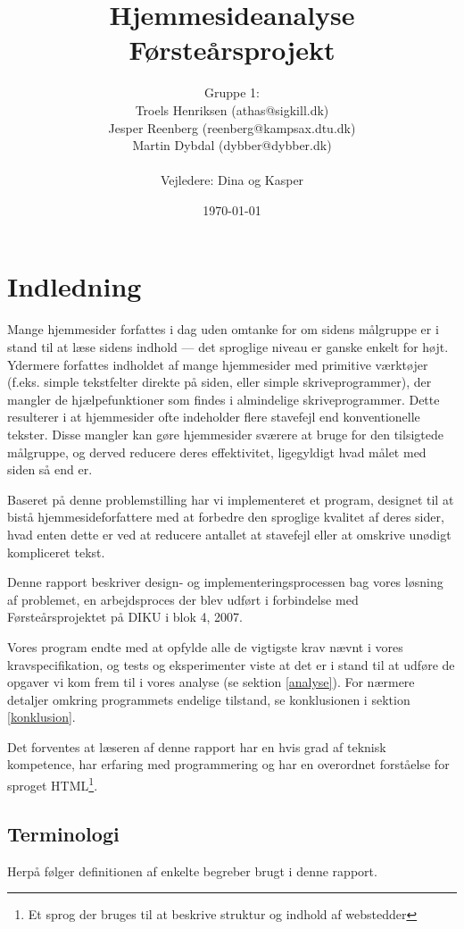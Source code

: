 \documentclass[a4paper,oneside]{memoir}
\title{Hjemmesideanalyse  \\ \small{Førsteårsprojekt}}
\author
{
  Gruppe 1:\\
  Troels Henriksen (athas@sigkill.dk)\\
  Jesper Reenberg (reenberg@kampsax.dtu.dk)\\
  Martin Dybdal (dybber@dybber.dk)\\ \\
  Vejledere: Dina og Kasper
}
\date{\today}
\begin{document}
\maketitle
\newpage
\tableofcontents*

\chapter{Indledning}
\label{indledning}
Mange hjemmesider forfattes i dag uden omtanke for om sidens målgruppe
er i stand til at læse sidens indhold --- det sproglige niveau er
ganske enkelt for højt. Ydermere forfattes indholdet af mange
hjemmesider med primitive værktøjer (f.eks. simple tekstfelter direkte
på siden, eller simple skriveprogrammer), der mangler de
hjælpefunktioner som findes i almindelige skriveprogrammer. Dette
resulterer i at hjemmesider ofte indeholder flere stavefejl end
konventionelle tekster. Disse mangler kan gøre hjemmesider sværere at
bruge for den tilsigtede målgruppe, og derved reducere deres
effektivitet, ligegyldigt hvad målet med siden så end er.

Baseret på denne problemstilling har vi implementeret et program,
designet til at bistå hjemmesideforfattere med at forbedre den
sproglige kvalitet af deres sider, hvad enten dette er ved at reducere
antallet at stavefejl eller at omskrive unødigt kompliceret tekst.

Denne rapport beskriver design- og implementeringsprocessen bag vores
løsning af problemet, en arbejdsproces der blev udført i forbindelse
med Førsteårsprojektet på DIKU i blok 4, 2007.

Vores program endte med at opfylde alle de vigtigste krav nævnt i
vores kravspecifikation, og tests og eksperimenter viste at det er i
stand til at udføre de opgaver vi kom frem til i vores analyse (se
sektion \ref{analyse}). For nærmere detaljer omkring programmets
endelige tilstand, se konklusionen i sektion \ref{konklusion}.

Det forventes at læseren af denne rapport har en hvis grad af teknisk
kompetence, har erfaring med programmering og har en overordnet
forståelse for sproget HTML\footnote{Et sprog der bruges til at
  beskrive struktur og indhold af webstedder}.

\section{Terminologi}

Herpå følger definitionen af enkelte begreber brugt i denne rapport.
\end{document}
